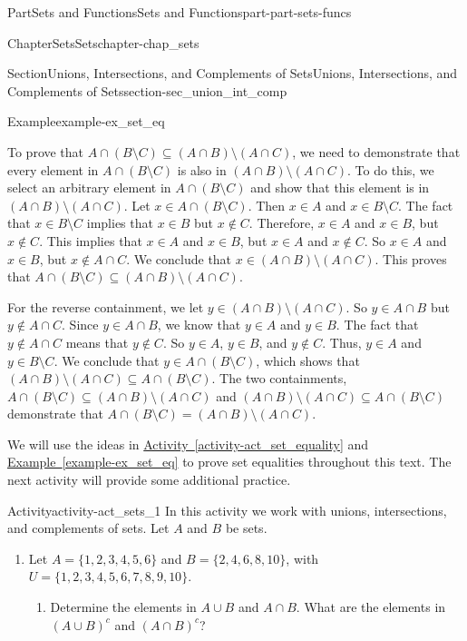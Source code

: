 \documentclass[oneside,10pt,]{book}
\newcommand{\xreffont}{\relax}
\numberwithin{equation}{chapter}
\begin{document}
\begin{partptx}{Part}{Sets and Functions}{}{Sets and Functions}{}{}{part-part-sets-funcs}
\begin{chapterptx}{Chapter}{Sets}{}{Sets}{}{}{chapter-chap_sets}
\begin{sectionptx}{Section}{Unions, Intersections, and Complements of Sets}{}{Unions, Intersections, and Complements of Sets}{}{}{section-sec_union_int_comp}
\begin{example}{Example}{}{example-ex_set_eq}
\par
To prove that \(A \cap (B \setminus C) \subseteq (A \cap B) \setminus (A \cap C)\), we need to demonstrate that every element in \(A \cap (B \setminus C)\) is also in \((A \cap B) \setminus (A \cap C)\). To do this, we select an arbitrary element in \(A \cap (B \setminus C)\) and show that this element is in \((A \cap B) \setminus (A \cap C)\). Let \(x \in A \cap (B \setminus C)\). Then \(x \in A\) and \(x \in B \setminus C\). The fact that \(x \in B \setminus C\) implies that \(x \in B\) but \(x \notin C\). Therefore, \(x \in A\) and \(x \in B\), but \(x \notin C\). This implies that \(x \in A\) and \(x \in B\), but \(x \in A\) and \(x \notin C\). So \(x \in A\) and \(x \in B\), but \(x \notin A \cap C\). We conclude that \(x \in (A \cap B) \setminus (A \cap C)\). This proves that \(A \cap (B \setminus C) \subseteq (A \cap B) \setminus (A \cap C)\).%
\par
For the reverse containment, we let \(y \in (A \cap B) \setminus (A \cap C)\). So \(y \in A \cap B\) but \(y \notin A \cap C\). Since \(y \in A \cap B\), we know that \(y \in A\) and \(y \in B\). The fact that \(y \notin A \cap C\) means that \(y \notin C\). So \(y \in A\), \(y \in B\), and \(y \notin C\). Thus, \(y \in A\) and \(y \in B \setminus C\). We conclude that \(y \in A \cap (B \setminus C)\), which shows that \((A \cap B) \setminus (A \cap C) \subseteq A \cap (B \setminus C)\). The two containments, \(A \cap (B \setminus C) \subseteq (A \cap B) \setminus (A \cap C)\) and \((A \cap B) \setminus (A \cap C) \subseteq A \cap (B \setminus C)\) demonstrate that \(A \cap (B \setminus C) = (A \cap B) \setminus (A \cap C)\).%
\end{example}
We will use the ideas in \hyperref[activity-act_set_equality]{Activity~{\xreffont\ref{activity-act_set_equality}}} and \hyperref[example-ex_set_eq]{Example~{\xreffont\ref{example-ex_set_eq}}} to prove set equalities throughout this text. The next activity will provide some additional practice.%
\begin{activity}{Activity}{}{activity-act_sets_1}%
In this activity we work with unions, intersections, and complements of sets. Let \(A\) and \(B\) be sets.%
\begin{enumerate}[font=\bfseries,label=(\alph*),ref=\alph*]%
\item{}Let \(A = \{1,2,3,4,5,6\}\) and \(B = \{2,4,6,8,10\}\), with \(U = \{1,2,3,4,5,6,7,8,9,10\}\).%
\begin{enumerate}[font=\bfseries,label=(\roman*),ref=\theenumi.\roman*]%
\item{}Determine the elements in \(A \cup B\) and \(A \cap B\). What are the elements in \((A \cup B)^c\) and \((A \cap B)^c\)?%

\end{enumerate}
\end{enumerate}
\end{activity}
\end{sectionptx}
\end{chapterptx}
\end{partptx}
\end{document}
